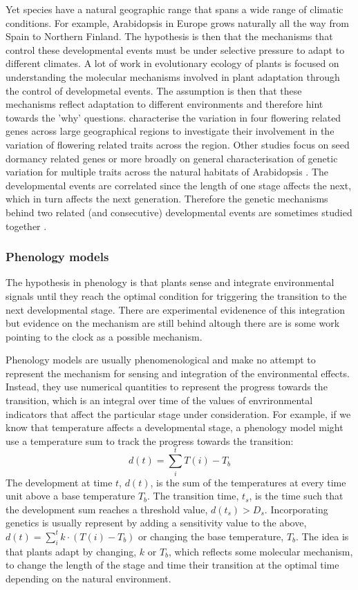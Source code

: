 Yet species have a natural geographic range that spans a wide range of climatic
conditions. For example, Arabidopsis in Europe grows naturally all the way from
Spain to Northern Finland. The hypothesis is then that the mechanisms that
control these developmental events must be under selective pressure to adapt to
different climates. A lot of work in evolutionary ecology of plants is focused
on understanding the molecular mechanisms involved in plant adaptation through
the control of developmetal events. The assumption is then that these mechanisms
reflect adaptation to different environments and therefore hint towards the
'why' questions. \citet{mendez-vigo_altitudinal_2011} characterise the variation
in four flowering related genes across large geographical regions to investigate
their involvement in the variation of flowering related traits across the
region. Other studies focus on seed dormancy related genes
\citep{chiang_dog1_2011} or more broadly on general characterisation of genetic
variation for multiple traits across the natural habitats of Arabidopsis
\citep{atwell_genome-wide_2010}. The developmental events are correlated since
the length of one stage affects the next, which in turn affects the next
generation. Therefore the genetic mechanisms behind two related (and
consecutive) developmental events are sometimes studied together
\citep{debieu_co-variation_2013}.

\subsubsection*{Phenology models}
The hypothesis in phenology is that plants sense and integrate environmental
signals until they reach the optimal condition for triggering the transition to
the next developmental stage. There are experimental evidenence of this
integration but evidence on the mechanism are still behind altough there are is
some work pointing to the clock as a possible mechanism.

Phenology models are usually phenomenological and make no attempt to represent
the mechanism for sensing and integration of the environmental effects. Instead,
they use numerical quantities to represent the progress towards the transition,
which is an integral over time of the values of envrironmental indicators that
affect the particular stage under consideration. For example, if we know that
temperature affects a developmental stage, a phenology model might use a
temperature sum to track the progress towards the transition:
$$
d(t) = \sum_{i}^{t} T(i) - T_b
$$
The development at time $t$, $d(t)$, is the sum of the temperatures at every
time unit above a base temperature $T_b$. The transition time, $t_s$, is the
time such that the development sum reaches a threshold value, $d(t_s) >
D_s$. Incorporating genetics is usually represent by adding a sensitivity value
to the above, $ d(t) = \sum_{i}^{t} k \cdot (T(i) - T_b)$ or changing the base temperature,
$T_b$. The idea is that plants adapt by changing, $k$ or $T_b$, which reflects
some molecular mechanism, to change the length of the stage and time their
transition at the optimal time depending on the natural environment.

